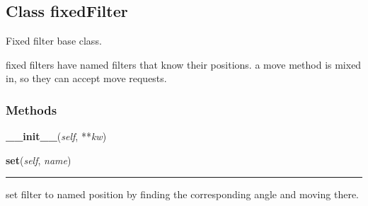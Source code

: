 \subsection{Class fixedFilter}

    \label{filterBase:fixedFilter}
Fixed filter base class.

fixed filters have named filters that know their positions. a move method 
is mixed in, so they can accept move requests.



  \subsubsection{Methods}

    \label{filterBase:fixedFilter:__init__}

    \vspace{0.5ex}

    \begin{boxedminipage}{\textwidth}

    \raggedright \textbf{\_\_init\_\_}(\textit{self}, **\textit{kw})

    \end{boxedminipage}

    \label{filterBase:fixedFilter:set}

    \vspace{0.5ex}

    \begin{boxedminipage}{\textwidth}

    \raggedright \textbf{set}(\textit{self}, \textit{name})

    \vspace{-1.5ex}

    \rule{\textwidth}{0.5\fboxrule}
    set filter to named position by finding the corresponding angle and 
    moving there.

    \vspace{1ex}

    \end{boxedminipage}

